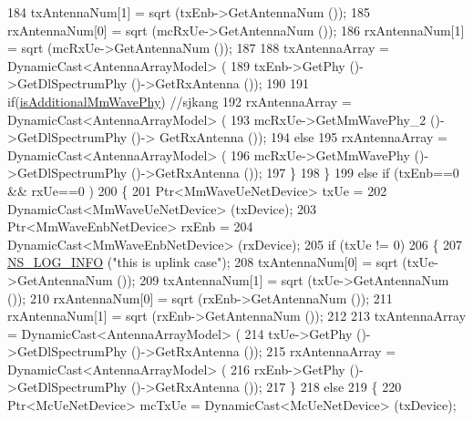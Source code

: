 \begin{DoxyCode}
184                         txAntennaNum[1] = sqrt (txEnb->GetAntennaNum ());
185                         rxAntennaNum[0] = sqrt (mcRxUe->GetAntennaNum ());
186                         rxAntennaNum[1] = sqrt (mcRxUe->GetAntennaNum ());
187 
188                         txAntennaArray = DynamicCast<AntennaArrayModel> (
189                                                 txEnb->GetPhy ()->GetDlSpectrumPhy ()->GetRxAntenna ());
190 
191                         \textcolor{keywordflow}{if}(\hyperlink{classns3_1_1MmWaveChannelMatrix_a6427b27c8ebd5fb5327c7403174caf31}{isAdditionalMmWavePhy}) \textcolor{comment}{//sjkang}
192                         rxAntennaArray = DynamicCast<AntennaArrayModel> (
193                                                 mcRxUe->GetMmWavePhy\_2 ()->GetDlSpectrumPhy ()->
      GetRxAntenna ());
194                         \textcolor{keywordflow}{else}
195                         rxAntennaArray = DynamicCast<AntennaArrayModel> (
196                                                 mcRxUe->GetMmWavePhy ()->GetDlSpectrumPhy ()->GetRxAntenna 
      ());
197                 \}
198         \}
199         \textcolor{keywordflow}{else} \textcolor{keywordflow}{if} (txEnb==0 && rxUe==0 )
200         \{
201                 Ptr<MmWaveUeNetDevice> txUe =
202                                                 DynamicCast<MmWaveUeNetDevice> (txDevice);
203                 Ptr<MmWaveEnbNetDevice> rxEnb =
204                                                 DynamicCast<MmWaveEnbNetDevice> (rxDevice);
205                 \textcolor{keywordflow}{if} (txUe != 0)
206                 \{
207                         \hyperlink{group__logging_gafbd73ee2cf9f26b319f49086d8e860fb}{NS\_LOG\_INFO} (\textcolor{stringliteral}{"this is uplink case"});
208                         txAntennaNum[0] = sqrt (txUe->GetAntennaNum ());
209                         txAntennaNum[1] = sqrt (txUe->GetAntennaNum ());
210                         rxAntennaNum[0] = sqrt (rxEnb->GetAntennaNum ());
211                         rxAntennaNum[1] = sqrt (rxEnb->GetAntennaNum ());
212 
213                         txAntennaArray = DynamicCast<AntennaArrayModel> (
214                                                 txUe->GetPhy ()->GetDlSpectrumPhy ()->GetRxAntenna ());
215                         rxAntennaArray = DynamicCast<AntennaArrayModel> (
216                                                 rxEnb->GetPhy ()->GetDlSpectrumPhy ()->GetRxAntenna ());
217                 \} 
218                 \textcolor{keywordflow}{else}
219                 \{
220                         Ptr<McUeNetDevice> mcTxUe = DynamicCast<McUeNetDevice> (txDevice);

\end{DoxyCode}
